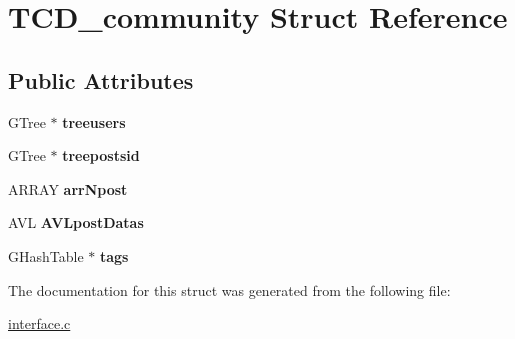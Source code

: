 \hypertarget{structTCD__community}{}\section{T\+C\+D\+\_\+community Struct Reference}
\label{structTCD__community}
\subsection*{Public Attributes}
\begin{DoxyCompactItemize}
\item 
G\+Tree $\ast$ {\bfseries treeusers}\hypertarget{structTCD__community_a96813e2c0c845970131e3612ebd42425}{}\label{structTCD__community_a96813e2c0c845970131e3612ebd42425}

\item 
G\+Tree $\ast$ {\bfseries treepostsid}\hypertarget{structTCD__community_a4e3a0ee51c092d8d929622b47b2bf49f}{}\label{structTCD__community_a4e3a0ee51c092d8d929622b47b2bf49f}

\item 
A\+R\+R\+AY {\bfseries arr\+Npost}\hypertarget{structTCD__community_a6ab75972989199dd5c1144c5ae49ef5c}{}\label{structTCD__community_a6ab75972989199dd5c1144c5ae49ef5c}

\item 
A\+VL {\bfseries A\+V\+Lpost\+Datas}\hypertarget{structTCD__community_a2d94df224da1beedd9ae4d80bc535ce5}{}\label{structTCD__community_a2d94df224da1beedd9ae4d80bc535ce5}

\item 
G\+Hash\+Table $\ast$ {\bfseries tags}\hypertarget{structTCD__community_a5aee67aa4a533e08d19fc929a35fabba}{}\label{structTCD__community_a5aee67aa4a533e08d19fc929a35fabba}

\end{DoxyCompactItemize}


The documentation for this struct was generated from the following file\+:\begin{DoxyCompactItemize}
\item 
\hyperlink{interface_8c}{interface.\+c}\end{DoxyCompactItemize}
